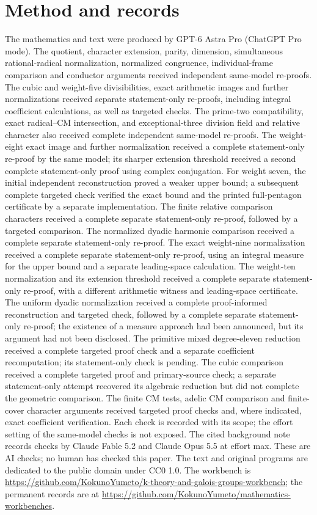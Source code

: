 \documentclass[11pt,a4paper]{article}
\theoremstyle{definition}
\theoremstyle{remark}
\newcommand{\workbenchurl}{https://github.com/KokunoYumeto/k-theory-and-galois-groups-workbench}
\newcommand{\recordurl}{https://github.com/KokunoYumeto/mathematics-workbenches}
\begin{document}
\section*{Method and records}
The mathematics and text were produced by GPT-6 Astra Pro (ChatGPT Pro mode). The quotient, character extension, parity, dimension, simultaneous rational-radical normalization, normalized congruence, individual-frame comparison and conductor arguments received independent same-model re-proofs. The cubic and weight-five divisibilities, exact arithmetic images and further normalizations received separate statement-only re-proofs, including integral coefficient calculations, as well as targeted checks. The prime-two compatibility, exact radical--CM intersection, and exceptional-three division field and relative character also received complete independent same-model re-proofs. The weight-eight exact image and further normalization received a complete statement-only re-proof by the same model; its sharper extension threshold received a second complete statement-only proof using complex conjugation. For weight seven, the initial independent reconstruction proved a weaker upper bound; a subsequent complete targeted check verified the exact bound and the printed full-pentagon certificate by a separate implementation. The finite relative comparison characters received a complete separate statement-only re-proof, followed by a targeted comparison. The normalized dyadic harmonic comparison received a complete separate statement-only re-proof. The exact weight-nine normalization received a complete separate statement-only re-proof, using an integral measure for the upper bound and a separate leading-space calculation. The weight-ten normalization and its extension threshold received a complete separate statement-only re-proof, with a different arithmetic witness and leading-space certificate. The uniform dyadic normalization received a complete proof-informed reconstruction and targeted check, followed by a complete separate statement-only re-proof; the existence of a measure approach had been announced, but its argument had not been disclosed. The primitive mixed degree-eleven reduction received a complete targeted proof check and a separate coefficient recomputation; its statement-only check is pending. The cubic comparison received a complete targeted proof and primary-source check; a separate statement-only attempt recovered its algebraic reduction but did not complete the geometric comparison. The finite CM tests, adelic CM comparison and finite-cover character arguments received targeted proof checks and, where indicated, exact coefficient verification. Each check is recorded with its scope; the effort setting of the same-model checks is not exposed. The cited background note records checks by Claude Fable 5.2 and Claude Opus 5.5 at effort max. These are AI checks; no human has checked this paper. The text and original programs are dedicated to the public domain under CC0 1.0. The workbench is \url{\workbenchurl}; the permanent records are at \url{\recordurl}.
\end{document}
